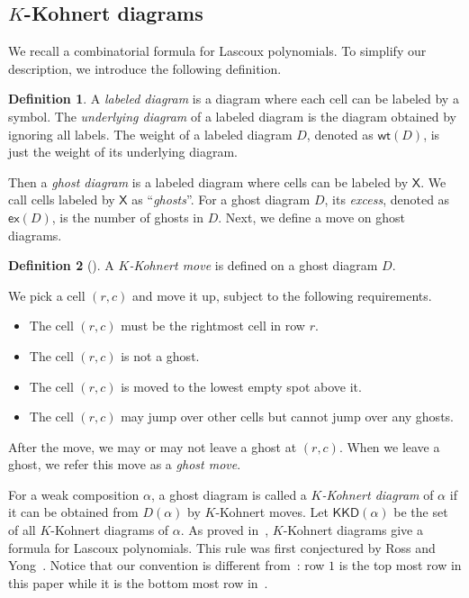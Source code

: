 \documentclass[10pt]{amsart}
\theoremstyle{plain}
\theoremstyle{plain}
\theoremstyle{definition}
\theoremstyle{definition}
\newtheorem{defn}[defn]{Definition}
\theoremstyle{definition}
\theoremstyle{plain}
\theoremstyle{plain}
\theoremstyle{plain}
\theoremstyle{plain}
\theoremstyle{plain}
\theoremstyle{remark}
\theoremstyle{remark}
\theoremstyle{plain}
\theoremstyle{plain}
\newcommand{\KKD}{\mathsf{KKD}}
\newcommand{\X}{\mathsf{X}}
\newcommand{\wt}{\mathsf{wt}}
\newcommand{\ex}{\mathsf{ex}}
\newcommand{\definition}[1]{{\color{darkred}\emph{#1}}}
\begin{document}
\subsection{\texorpdfstring{$K$}{TEXT}-Kohnert diagrams}
We recall a combinatorial formula for Lascoux polynomials. 
To simplify our description, 
we introduce the following definition.
\begin{defn}
A \definition{labeled diagram} 
is a diagram where each cell can be labeled 
by a symbol.
The \definition{underlying diagram} of a labeled diagram
is the diagram obtained by ignoring all labels. 
The weight of a labeled diagram $D$, denoted as $\wt(D)$,
is just the weight of its underlying diagram.
\end{defn}

Then a \definition{ghost diagram} is a labeled diagram 
where cells can be labeled by $\X$.
We call cells labeled by $\X$ as ``\definition{ghosts}''. 
For a ghost diagram $D$, its \definition{excess}, denoted as $\ex(D)$,
is the number of ghosts in $D$.
Next, we define a move on ghost diagrams.

\begin{defn}[\cite{RossY}]
A \definition{$K$-Kohnert move} is defined on a ghost diagram $D$. 

We pick a cell $(r,c)$ and move it up, 
subject to the following requirements.
\begin{itemize}
\item The cell $(r,c)$ must be the rightmost cell in row $r$.
\item The cell $(r,c)$ is not a ghost.
\item The cell $(r,c)$ is moved to the lowest empty spot above it.
\item The cell $(r,c)$ may jump over other cells but cannot jump over any ghosts.
\end{itemize}
After the move, 
we may or may not leave a ghost at $(r,c)$. 
When we leave a ghost, 
we refer this move as a \definition{ghost move}.
\end{defn}

For a weak composition $\alpha$,
a ghost diagram is called a \definition{$K$-Kohnert diagram}
of $\alpha$ if it can be obtained from $D(\alpha)$
by $K$-Kohnert moves. 
Let $\KKD(\alpha)$ be the set of all $K$-Kohnert diagrams
of $\alpha$.
As proved in~\cite{PY}, 
$K$-Kohnert diagrams give a formula for Lascoux polynomials. 
This rule was first conjectured by Ross and Yong~\cite{RossY}.
Notice that our convention is different from~\cite{PY}:
row $1$ is the top most row in this paper while it is the 
bottom most row in~\cite{PY}. 
\end{document}
